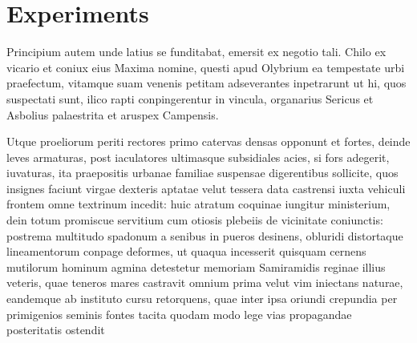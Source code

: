 \chapter{Experiments}
\label{chap:experiments}
Principium autem unde latius se funditabat, emersit ex negotio tali. Chilo ex vicario et coniux eius Maxima nomine, questi apud Olybrium ea tempestate urbi praefectum, vitamque suam venenis petitam adseverantes inpetrarunt ut hi, quos suspectati sunt, ilico rapti conpingerentur in vincula, organarius Sericus et Asbolius palaestrita et aruspex Campensis.

Utque proeliorum periti rectores primo catervas densas opponunt et fortes, deinde leves armaturas, post iaculatores ultimasque subsidiales acies, si fors adegerit, iuvaturas, ita praepositis urbanae familiae suspensae digerentibus sollicite, quos insignes faciunt virgae dexteris aptatae velut tessera data castrensi iuxta vehiculi frontem omne textrinum incedit: huic atratum coquinae iungitur ministerium, dein totum promiscue servitium cum otiosis plebeiis de vicinitate coniunctis: postrema multitudo spadonum a senibus in pueros desinens, obluridi distortaque lineamentorum conpage deformes, ut quaqua incesserit quisquam cernens mutilorum hominum agmina detestetur memoriam Samiramidis reginae illius veteris, quae teneros mares castravit omnium prima velut vim iniectans naturae, eandemque ab instituto cursu retorquens, quae inter ipsa oriundi crepundia per primigenios seminis fontes tacita quodam modo lege vias propagandae posteritatis ostendit